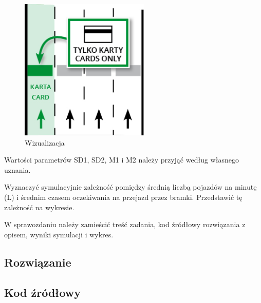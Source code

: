 \documentclass[a4paper,11pt,titlepage]{article}
\begin{document}
\begin{figure}[H]
 \centering
 \includegraphics[width=0.35\columnwidth]{img/tresc.PNG}
 \caption{Wizualizacja}
 \label{fig:wykres1}
\end{figure}

Wartości parametrów SD1, SD2, M1 i M2 należy przyjąć według własnego uznania.

Wyznaczyć symulacyjnie zależność pomiędzy średnią liczbą pojazdów na minutę (L) i średnim czasem oczekiwania na przejazd przez bramki. Przedstawić tę zależność na wykresie.

W sprawozdaniu należy zamieścić treść zadania, kod źródłowy rozwiązania z opisem, wyniki symulacji i wykres.




\subsection{Rozwiązanie}




\subsection{Kod źródłowy}

% 
\end{document}
